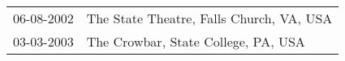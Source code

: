 \begin{supertabular}{ll}
 06-08-2002 &  The State Theatre, Falls Church, VA, USA \\
 03-03-2003 &       The Crowbar, State College, PA, USA \\
\end{supertabular}

